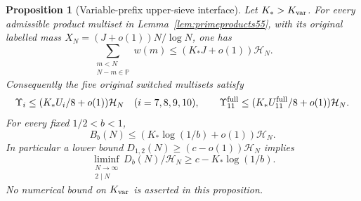 \documentclass[11pt]{article}
\newtheorem{proposition}[theorem]{Proposition}
\newcommand{\PP}{\mathbb P}
\newcommand{\HN}{\mathcal H_N}
\begin{document}
\begin{proposition}[Variable-prefix upper-sieve interface]
\label{prop:variable-prefix-upper}
Let $K_*>K_{\rm var}$. For every admissible product multiset in
Lemma~\ref{lem:primeproducts55}, with its original labelled mass
$X_N=(J+o(1))N/\log N$, one has
\[
 \sum_{\substack{m<N\\N-m\in\PP}}w(m)
       \le(K_*J+o(1))\HN.
\]
Consequently the five original switched multisets satisfy
\[
 \Upsilon_i\le(K_*U_i/8+o(1))\HN\quad(i=7,8,9,10),\qquad
 \Upsilon_{11}^{\rm full}
       \le(K_*U_{11}^{\rm full}/8+o(1))\HN.
\]
For every fixed $1/2<b<1$,
\[
 B_b(N)\le(K_*\log(1/b)+o(1))\HN.
\]
In particular a lower bound $D_{1,2}(N)\ge(c-o(1))\HN$ implies
\[
 \liminf_{\substack{N\to\infty\\2\mid N}}D_b(N)/\HN
       \ge c-K_*\log(1/b).
\]
No numerical bound on $K_{\rm var}$ is asserted in this proposition.
\end{proposition}
\end{document}

